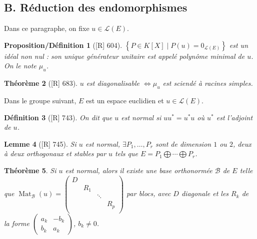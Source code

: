 \documentclass[10pt, a4paper, parskip=full, twoside, twocolumn]{report}
\newtheorem{definition}{Définition}
\newtheorem{theorem}[definition]{Théorème}
\newtheorem{proposition_def}[definition]{Proposition/Définition}
\newtheorem{lemma}[definition]{Lemme}
\DeclareMathOperator{\Mat}{Mat}
\begin{document}
\subsection*{B. Réduction des endomorphismes}
\textcolor{paragraphtext}{Dans ce paragraphe, on fixe $u\in \mathcal{L}(E)$.}

\begin{proposition_def}[\textnormal{[R] 604}]
	$\left\{P\in K[X]\mid P(u)=0_{\mathcal{L}(E)}\right\}$ est un idéal non nul : son unique
	générateur unitaire est appelé \emph{polynôme minimal de $u$}. On le note $\mu_u$.
\end{proposition_def}

\begin{theorem}[\textnormal{[R] 683}]
	$u$ est diagonalisable $\iff \mu_u$ est sciendé à racines simples.
\end{theorem}

\textcolor{paragraphtext}{Dans le groupe suivant, $E$ est un espace euclidien et $u\in\mathcal{L}(E)$.}
\begin{definition}[\textnormal{[R] 743}]
	On dit que $u$ est \emph{normal} si $uu^* = u^*u$ où $u^*$ est l'adjoint de $u$.
\end{definition}


\begin{tcolorbox}[
    breakable, %
    colback=developpement, %
    colframe=gray!0!black, %
    boxrule=0pt, %
    arc=1mm, %
	boxsep=0pt,
	left=0pt, right=0pt, top=0pt, bottom=0pt
]
\begin{lemma}[\textnormal{[R] 745}]
	\label{148dev21}
	Si $u$ est normal, $\exists P_1,\dots, P_r$ sont de dimension $1$ ou $2$, 
	deux à deux orthogonaux et stables par $u$ tels que $E=P_1\bigoplus\cdots\bigoplus P_r$.
\end{lemma}
\begin{theorem}
	\label{148dev22}
	Si $u$ est normal, alors il existe une base orthonormée $\mathcal{B}$ de $E$ telle que
	$\Mat_{\mathcal{B}}(u) = \left(\begin{smallmatrix}
		D & & & \\
		& R_1 & & \\
		& & \ddots & \\
		& & & R_p \\
	\end{smallmatrix}\right)$ par blocs, avec $D$ diagonale et les $R_k$ de la forme $\begin{pmatrix}
		a_k & -b_k \\ b_k & a_k
	\end{pmatrix}$, $b_k\neq 0$.
\end{theorem}
\end{tcolorbox}
\end{document}
